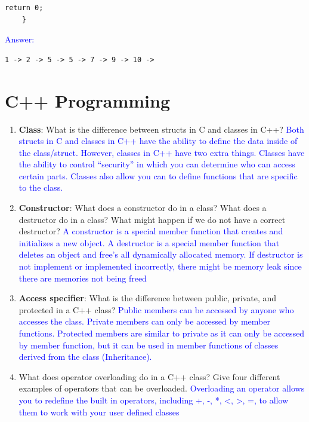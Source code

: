 \documentclass{article}
\begin{document}
\begin{enumerate}[label=(\alph*)]
\begin{lstlisting}[style = CStyle]
        return 0;
    }
\end{lstlisting}

\textcolor{blue} {Answer:}
\begin{lstlisting}[style=CStyle]
1 -> 2 -> 5 -> 5 -> 7 -> 9 -> 10 ->
\end{lstlisting}

\end{enumerate}
\newpage
\section{C++ Programming}

\begin{enumerate}[label=(\alph*)]
    \item \textbf{Class}: What is the difference between structs in C and classes in C++?
    \newline\textcolor{blue}{Both structs in C and classes in C++ have the ability to define the data inside of the class/struct. However,  classes in C++ have two extra things. Classes have the ability to control “security” in which you can determine who can access certain parts. Classes also allow you can to define functions that are specific to the class.}
    \item \textbf{Constructor}: What does a constructor do in a class? What does a destructor do in a class? What might happen if we do not have a correct destructor?
    \newline\textcolor{blue}{A constructor is a special member function that creates and initializes a new object. A destructor is a special member function that deletes an object and free’s all dynamically allocated memory. If destructor is not implement or implemented incorrectly, there might be memory leak since there are memories not being freed}
    \item \textbf{Access specifier}: What is the difference between public, private, and protected in a C++ class?
    \newline\textcolor{blue}{Public members can be accessed by anyone who accesses the class. Private members can only be accessed by member functions. Protected members are similar to private as it can only be accessed by member function, but it can be used in member functions of classes derived from the class (Inheritance).}
    \item What does operator overloading do in a C++ class? Give four different examples of operators that can be overloaded.
    \newline\textcolor{blue}{Overloading an operator allows you to redefine the built in operators, including +, -, *, <, >, =, to allow them to work with your user defined classes}

\end{enumerate}
\end{document}
